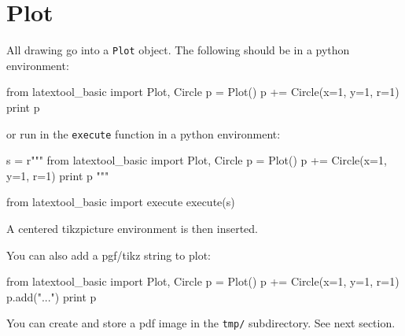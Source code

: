 \section{Plot}

All drawing go into a \verb!Plot! object.
The following should be in a python environment:
\begin{console}
from latextool_basic import Plot, Circle
p = Plot()
p += Circle(x=1, y=1, r=1)
print p
\end{console}
or run in the \verb!execute! function in a python environment:
\begin{console}
s = r"""
from latextool_basic import Plot, Circle
p = Plot()
p += Circle(x=1, y=1, r=1)
print p
"""

from latextool_basic import execute
execute(s)
\end{console}

A centered tikzpicture environment is then inserted.

You can also add a pgf/tikz string to plot:
\begin{console}
from latextool_basic import Plot, Circle
p = Plot()
p += Circle(x=1, y=1, r=1)
p.add("\draw ...")
print p
\end{console}

You can create and store a pdf image in the \verb!tmp/! subdirectory.
See next section.
